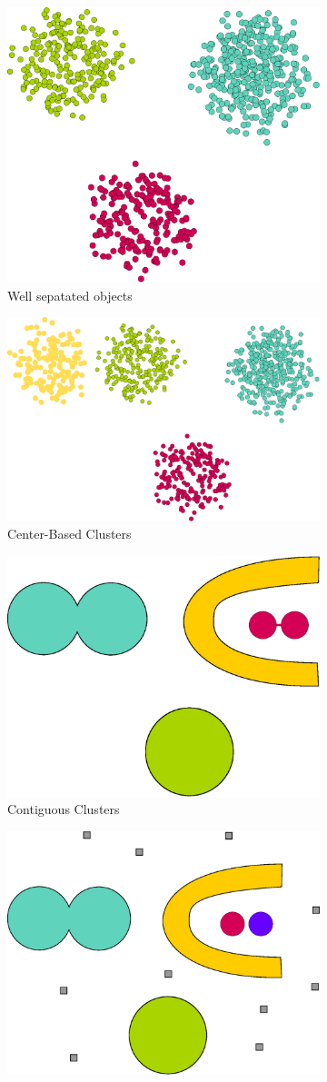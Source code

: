 \begin{figure}[h]
\centering
\begin{subfigure}{.49\textwidth}
  \centering
  \includegraphics[width=.5\linewidth]{img/wellSeparatedObjects.eps}
  \caption{Well sepatated objects}
  \label{fig:wellSeparatedObjects}
\end{subfigure}
\begin{subfigure}{.49\textwidth}
  \centering
  \includegraphics[width=.5\linewidth]{img/centerBasedClusters.eps}
  \caption{Center-Based Clusters}
  \label{fig:centerBasedClusters}
\end{subfigure}
\vspace*{0.5cm} 
\begin{subfigure}{.49\textwidth}
  \centering
  \includegraphics[width=.5\linewidth]{img/contiguousClusters.eps}
  \caption{Contiguous Clusters}
  \label{fig:contiguousClusters}
\end{subfigure}
\begin{subfigure}{.49\textwidth}
  \centering
  \includegraphics[width=.5\linewidth]{img/densityClusters.eps}

\end{subfigure}
\end{figure}
